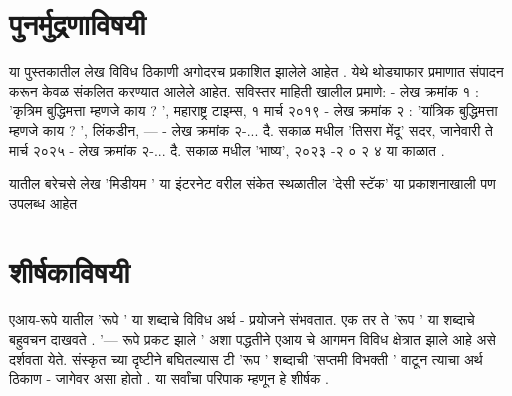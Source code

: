 \chapter*{पुनर्मुद्रणाविषयी}

या पुस्तकातील लेख विविध ठिकाणी अगोदरच प्रकाशित झालेले आहेत .  येथे थोड्याफार प्रमाणात संपादन करून केवळ संकलित करण्यात आलेले आहेत.  सविस्तर माहिती खालील प्रमाणे:
- लेख क्रमांक १ : 'कृत्रिम बुद्धिमत्ता म्हणजे काय ? ', महाराष्ट्र टाइम्स, १  मार्च २०१९
- लेख क्रमांक २  : 'यांत्रिक बुद्धिमत्ता म्हणजे काय ? ', लिंकडीन, --- 
- लेख क्रमांक २-...  दै. सकाळ मधील 'तिसरा मेंदू' सदर, जानेवारी ते मार्च २०२५
- लेख क्रमांक २-... दै. सकाळ मधील 'भाष्य', २०२३ -२ ० २ ४  या काळात . 

यातील बरेचसे लेख 'मिडीयम '  या इंटरनेट वरील संकेत स्थळातील 'देसी स्टॅक' या प्रकाशनाखाली पण उपलब्ध आहेत 

\chapter*{शीर्षकाविषयी }
एआय-रूपे यातील 'रूपे '  या शब्दाचे विविध अर्थ - प्रयोजने संभवतात. एक तर ते 'रूप ' या शब्दाचे बहुवचन दाखवते .  '--- रूपे प्रकट झाले '  अशा पद्धतीने एआय चे आगमन विविध क्षेत्रात झाले आहे असे दर्शवता येते. संस्कृत च्या दृष्टीने बघितल्यास टी  'रूप '  शब्दाची 'सप्तमी विभक्ती '  वाटून त्याचा अर्थ ठिकाण - जागेवर असा होतो .  या सर्वांचा परिपाक म्हणून हे शीर्षक . 